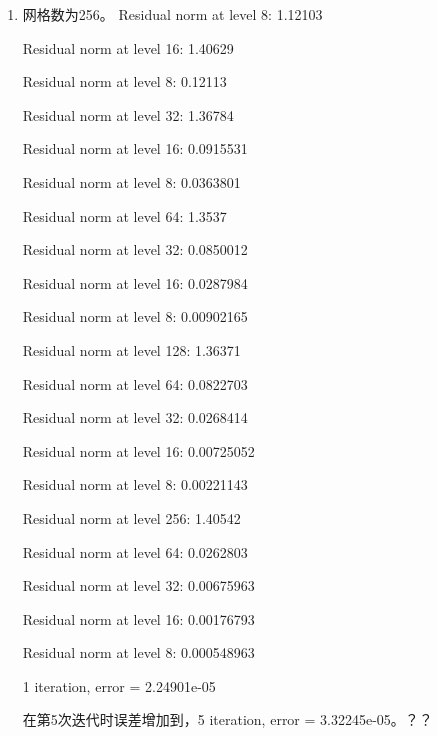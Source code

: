 \documentclass[UTF8]{ctexart}
\begin{document}
\begin{enumerate}
    Residual norm at level 8: 0.0363804

    Residual norm at level 64: 1.35371

    Residual norm at level 32: 0.0850023

    Residual norm at level 16: 0.0287987

    Residual norm at level 8: 0.00902171

    Residual norm at level 128: 1.36373

    Residual norm at level 64: 0.0822714

    Residual norm at level 32: 0.0268418

    Residual norm at level 16: 0.00725061

    Residual norm at level 8: 0.00221144

    1 iteration, error = 6.30315e-05

    在第5次迭代时误差增加到，5 iteration, error = 9.38406e-05 ？？


\item 网格数为256。
    Residual norm at level 8: 1.12103

    Residual norm at level 16: 1.40629

    Residual norm at level 8: 0.12113

    Residual norm at level 32: 1.36784

    Residual norm at level 16: 0.0915531

    Residual norm at level 8: 0.0363801

    Residual norm at level 64: 1.3537

    Residual norm at level 32: 0.0850012

    Residual norm at level 16: 0.0287984

    Residual norm at level 8: 0.00902165

    Residual norm at level 128: 1.36371

    Residual norm at level 64: 0.0822703

    Residual norm at level 32: 0.0268414

    Residual norm at level 16: 0.00725052

    Residual norm at level 8: 0.00221143

    Residual norm at level 256: 1.40542

    Residual norm at level 64: 0.0262803

    Residual norm at level 32: 0.00675963

    Residual norm at level 16: 0.00176793

    Residual norm at level 8: 0.000548963

    1 iteration, error = 2.24901e-05

    在第5次迭代时误差增加到，5 iteration, error = 3.32245e-05。？？

\end{enumerate}
\end{document}

